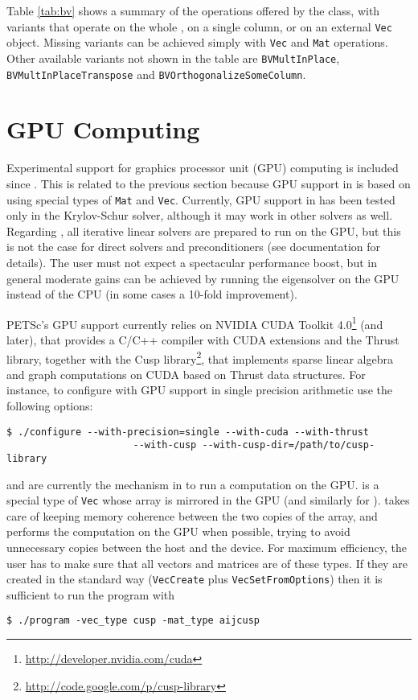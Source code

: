 Table \ref{tab:bv} shows a summary of the operations offered by the  class, with variants that operate on the whole , on a single column, or on an external \texttt{Vec} object. Missing variants can be achieved simply with \texttt{Vec} and \texttt{Mat} operations. Other available variants not shown in the table are \texttt{BVMultInPlace}, \texttt{BVMultInPlaceTranspose} and \texttt{BVOrthogonalizeSomeColumn}.

\section{GPU Computing}
\label{sec:gpu}

Experimental support for graphics processor unit (GPU) computing is included since . This is related to the previous section because GPU support in \petsc is based on using special types of \texttt{Mat} and \texttt{Vec}. Currently, GPU support in \slepc has been tested only in the Krylov-Schur  solver, although it may work in other solvers as well. Regarding \petsc, all iterative linear solvers are prepared to run on the GPU, but this is not the case for direct solvers and preconditioners (see \petsc documentation for details). The user must not expect a spectacular performance boost, but in general moderate gains can be achieved by running the eigensolver on the GPU instead of the CPU (in some cases a 10-fold improvement).

PETSc's GPU support currently relies on NVIDIA CUDA Toolkit 4.0\footnote{\url{http://developer.nvidia.com/cuda}} (and later), that provides a C/C++ compiler with CUDA extensions and the Thrust library, together with the Cusp library\footnote{\url{http://code.google.com/p/cusp-library}}, that implements sparse linear algebra and graph computations on CUDA based on Thrust data structures. For instance, to configure \petsc with GPU support in single precision arithmetic use the following options:
	\begin{Verbatim}[fontsize=\small]
	$ ./configure --with-precision=single --with-cuda --with-thrust
                      --with-cusp --with-cusp-dir=/path/to/cusp-library
	\end{Verbatim}

 and  are currently the mechanism in \petsc to run a computation on the GPU.  is a special type of \texttt{Vec} whose array is mirrored in the GPU (and similarly for ). \petsc takes care of keeping memory coherence between the two copies of the array, and performs the computation on the GPU when possible, trying to avoid unnecessary copies between the host and the device. For maximum efficiency, the user has to make sure that all vectors and matrices are of these types. If they are created in the standard way (\texttt{VecCreate} plus \texttt{VecSetFromOptions}) then it is sufficient to run the program with
	\begin{Verbatim}[fontsize=\small]
	$ ./program -vec_type cusp -mat_type aijcusp
	\end{Verbatim}

